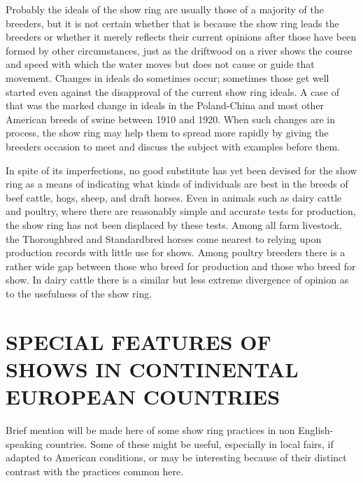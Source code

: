 Probably the ideals of the show ring are usually those of a majority
of the breeders, but it is not certain whether that is because the show
ring leads the breeders or whether it merely reflects their current opinions
after those have been formed by other circumstances, just as the
driftwood on a river shows the course and speed with which the water
moves but does not cause or guide that movement. Changes in ideals
do sometimes occur; sometimes those get well started even against the
disapproval of the current show ring ideals. A case of that was the
marked change in ideals in the Poland-China and most other American
breeds of swine between 1910 and 1920. When such changes are in process,
the show ring may help them to spread more rapidly by giving the
breeders occasion to meet and discuss the subject with examples before
them.

In spite of its imperfections, no good substitute has yet been devised
for the show ring as a means of indicating what kinds of individuals are
best in the breeds of beef cattle, hogs, sheep, and draft horses. Even in
animals such as dairy cattle and poultry, where there are reasonably
simple and accurate tests for production, the show ring has not been
displaced by these tests. Among all farm livestock, the Thoroughbred
and Standardbred horses come nearest to relying upon production records
with little use for shows. Among poultry breeders there is a rather
wide gap between those who breed for production and those who breed
for show. In dairy cattle there is a similar but less extreme divergence
of opinion as to the usefulness of the show ring.

\section*{SPECIAL FEATURES OF SHOWS IN CONTINENTAL EUROPEAN COUNTRIES}

Brief mention will be made here of some show ring practices in non English-
speaking countries. Some of these might be useful, especially
in local fairs, if adapted to American conditions, or may be interesting
because of their distinct contrast with the practices common here.

